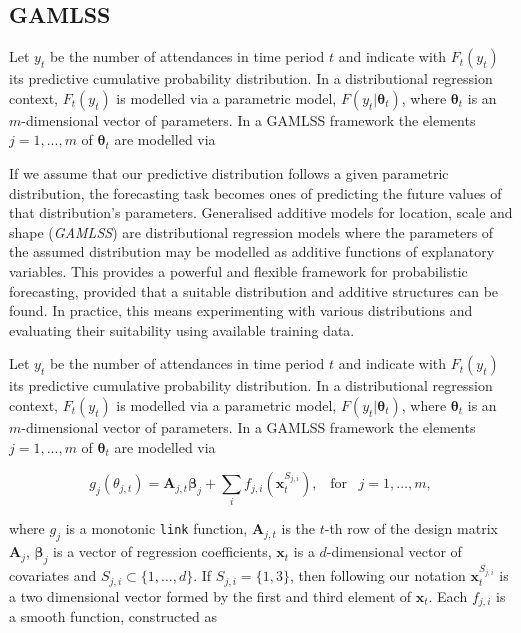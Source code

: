 \documentclass[]{elsarticle} %
\begin{document}
\hypertarget{gamlss}{%
\subsection{GAMLSS}\label{gamlss}}

Let \(y_t\) be the number of attendances in time period \(t\) and indicate with \(F_t(y_t)\) its predictive cumulative probability distribution. In a distributional regression context, \(F_t(y_t)\) is modelled via a parametric model, \(F(y_t|\bm \theta_t)\), where \(\bm \theta_t\) is an \(m\)-dimensional vector of parameters. In a GAMLSS framework \citet{Rigby2005} the elements \(j=1,...,m\) of \(\bm \theta_t\) are modelled via

If we assume that our predictive distribution follows a given parametric distribution, the forecasting task becomes ones of predicting the future values of that distribution's parameters. Generalised additive models for location, scale and shape (\emph{GAMLSS}) are distributional regression models where the parameters of the assumed distribution may be modelled as additive functions of explanatory variables. This provides a powerful and flexible framework for probabilistic forecasting, provided that a suitable distribution and additive structures can be found. In practice, this means experimenting with various distributions and evaluating their suitability using available training data.

Let \(y_t\) be the number of attendances in time period \(t\) and indicate with \(F_t(y_t)\) its predictive cumulative probability distribution. In a distributional regression context, \(F_t(y_t)\) is modelled via a parametric model, \(F(y_t|\bm \theta_t)\), where \(\bm \theta_t\) is an \(m\)-dimensional vector of parameters. In a GAMLSS framework \citep{Rigby2005} the elements \(j=1,...,m\) of \(\bm \theta_t\) are modelled via

\begin{equation}
    g_j(\theta_{j,t})=\mathbf{A}_{j,t} \bm{\beta}_j + \sum_{i} f_{j,i}({\bm x}^{S_{j,i}}_t), \;\;\; \text{for} \;\;\; j = 1, \dots, m,
    \label{eq:basicGAM}
\end{equation}

where \(g_j\) is a monotonic \texttt{link} function, \(\mathbf{A}_{j,t}\) is the \(t\)-th row of the design matrix \(\mathbf{A}_j\), \(\bm \beta_j\) is a vector of regression coefficients, \(\bm x_t\) is a \(d\)-dimensional vector of covariates and \(S_{j,i} \subset \{1, \dots, d\}\). If \(S_{j,i} = \{1, 3\}\), then following our notation \({\bm x}_{t}^{S_{j,i}}\) is a two dimensional vector formed by the first and third element of \(\bm x_t\). Each \(f_{j,i}\) is a smooth function, constructed as
\end{document}
